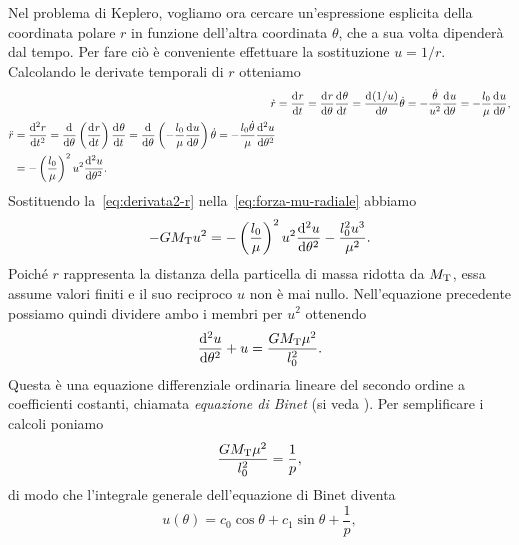 Nel problema di Keplero, vogliamo ora cercare un'espressione esplicita della
coordinata polare $r$ in funzione dell'altra coordinata $\theta$, che a sua
volta dipenderà dal tempo. Per fare ciò è conveniente effettuare la sostituzione
$u=1/r$. Calcolando le derivate temporali di $r$ otteniamo
\begin{subequations}
  \begin{align}
    \dot{r} &= \toder{r}{t} = \toder{r}{\theta}\toder{\theta}{t} =
    \toder{(1/u)}{\theta}\dot{\theta} =
    -\frac{\dot{\theta}}{u^2}\toder{u}{\theta}
    = -\frac{l_0}{\mu}\toder{u}{\theta}, \label{eq:derivata1-r}\\
    \begin{split}
      \ddot{r} &= \toder[2]{r}{t} = \toder{}{\theta}
      \left( \toder{r}{t} \right)\toder{\theta}{t} = \toder{}{\theta}
      \left( -\frac{l_0}{\mu}\toder{u}{\theta} \right)\dot{\theta} =
      -\frac{l_0\dot{\theta}}{\mu}\toder[2]{u}{\theta} \\
      &= - \left( \frac{l_0}{\mu}
      \right)^2u^2\toder[2]{u}{\theta}. \label{eq:derivata2-r}
    \end{split}
  \end{align}
\end{subequations}
Sostituendo la~\eqref{eq:derivata2-r} nella~\eqref{eq:forza-mu-radiale} abbiamo
\begin{equation}
  -GM_\textup{T}u^2 = -
  \left(
    \frac{l_0}{\mu}
  \right)^2u^2\toder[2]{u}{\theta} - \frac{l_0^2u^3}{\mu^2}.
\end{equation}
Poiché $r$ rappresenta la distanza della particella di massa ridotta da
$M_\textup{T}$, essa assume valori finiti e il suo reciproco $u$ non è mai
nullo. Nell'equazione precedente possiamo quindi dividere ambo i membri per
$u^2$ ottenendo
\begin{equation}
  \toder[2]{u}{\theta} + u = \frac{GM_\textup{T}\mu^2}{l_0^2}.
\end{equation}
Questa è una equazione differenziale ordinaria lineare del secondo ordine a
coefficienti costanti, chiamata \emph{equazione di Binet}
(si veda \textcite[120]{fabrizio:meccanica}). Per semplificare i calcoli poniamo
\begin{equation}
  \label{eq:reciproco-semilato}
  \frac{GM_\textup{T}\mu^2}{l_0^2} = \frac{1}{p},
\end{equation}
di modo che l'integrale generale dell'equazione di Binet diventa
\begin{equation}
  \label{eq:soluzione-binet}
  u(\theta) = c_0\cos\theta + c_1\sin\theta + \frac{1}{p},
\end{equation}
